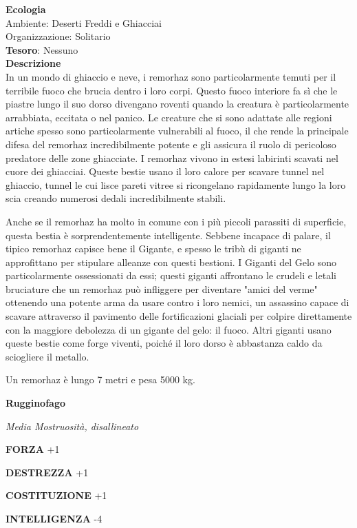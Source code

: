\begin{multicols}{2}
	\textbf{Ecologia}\\
	Ambiente: Deserti Freddi e Ghiacciai\\
	Organizzazione: Solitario\\
	\textbf{Tesoro}: Nessuno\\
	\textbf{Descrizione}\\
	In un mondo di ghiaccio e neve, i remorhaz sono particolarmente temuti per il terribile fuoco che brucia dentro i loro corpi. Questo fuoco interiore fa sì che le piastre lungo il suo dorso divengano roventi quando la creatura è particolarmente arrabbiata, eccitata o nel panico. Le creature che si sono adattate alle regioni artiche spesso sono particolarmente vulnerabili al fuoco, il che rende la principale difesa del remorhaz incredibilmente potente e gli assicura il ruolo di pericoloso predatore delle zone ghiacciate. I remorhaz vivono in estesi labirinti scavati nel cuore dei ghiacciai. Queste bestie usano il loro calore per scavare tunnel nel ghiaccio, tunnel le cui lisce pareti vitree si ricongelano rapidamente lungo la loro scia creando numerosi dedali incredibilmente stabili.

	Anche se il remorhaz ha molto in comune con i più piccoli parassiti di superficie, questa bestia è sorprendentemente intelligente. Sebbene incapace di palare, il tipico remorhaz capisce bene il Gigante, e spesso le tribù di giganti ne approfittano per stipulare alleanze con questi bestioni. I Giganti del Gelo sono particolarmente ossessionati da essi; questi giganti affrontano le crudeli e letali bruciature che un remorhaz può infliggere per diventare "amici del verme" ottenendo una potente arma da usare contro i loro nemici, un assassino capace di scavare attraverso il pavimento delle fortificazioni glaciali per colpire direttamente con la maggiore debolezza di un gigante del gelo: il fuoco. Altri giganti usano queste bestie come forge viventi, poiché il loro dorso è abbastanza caldo da sciogliere il metallo.

	Un remorhaz è lungo 7 metri e pesa 5000 kg.



	\medskip{}\textbf{Rugginofago}

	\textit{Media Mostruosità, disallineato}

	\textbf{FORZA} +1

	\textbf{DESTREZZA} +1

	\textbf{COSTITUZIONE} +1

	\textbf{INTELLIGENZA} -4


\end{multicols}
